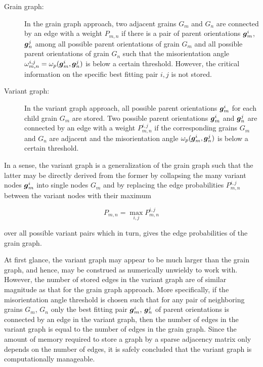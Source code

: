 \documentclass{elsarticle}
\renewcommand{\vec}[1]{\ensuremath \mathbf{\boldsymbol{#1}}}
\numberwithin{equation}{section}
\begin{document}
\begin{description}
\item[Grain graph:] In the grain graph approach, two adjacent grains $G_{m}$ and $G_{n}$ are connected by an edge with a weight $P_{m,n}$ if there is a pair of parent orientations $\vec g_{m}^{i}$, $\vec g_{n}^{j}$ among all possible parent orientations of grain $G_{m}$ and all possible parent orientations of grain $G_{n}$ such that the misorientation angle $\omega_{m,n}^{i,j}=\omega_p(\vec g_m^i, \vec g_n^j)$ is below a certain threshold. However, the critical information on the specific best fitting pair $i, j$ is not stored.

\item[Variant graph:] In the variant graph approach, all possible parent orientations $\vec g_m^i$ for each child grain $G_m$ are stored. Two possible parent orientations $\vec g_m^i$ and $\vec g_n^j$ are connected by an edge with a weight $P_{m,n}^{i,j}$ if the corresponding grains $G_{m}$ and $G_{n}$ are adjacent and the misorientation angle $\omega_p(\vec g_m^i, \vec g_n^j)$ is below a certain threshold.
\end{description}

In a sense, the variant graph is a generalization of the grain graph such that the latter may be directly derived from the former by collapsing the many variant nodes $\vec g_m^i$ into single nodes $G_m$ and by replacing the edge probabilities $P_{m,n}^{i,j}$ between the variant nodes with their maximum 

\begin{equation*}
  P_{m,n} = \max_{i,j} P_{m,n}^{i,j} 
\end{equation*}

over all possible variant pairs which in turn, gives the edge probabilities of the grain graph.

At first glance, the variant graph may appear to be much larger than the grain graph, and hence, may be construed as numerically unwieldy to work with. However, the number of stored edges in the variant graph are of similar magnitude as that for the grain graph approach. More specifically, if the misorientation angle threshold is chosen such that for any pair of neighboring grains $G_m$, $G_n$ only the best fitting pair $\vec g_m^i$, $\vec g_n^j$ of parent orientations is connected by an edge in the variant graph, then the number of edges in the variant graph is equal to the number of edges in the grain graph. Since the amount of memory required to store a graph by a sparse adjacency matrix only depends on the number of edges, it is safely concluded that the variant graph is computationally manageable. 
\end{document}
